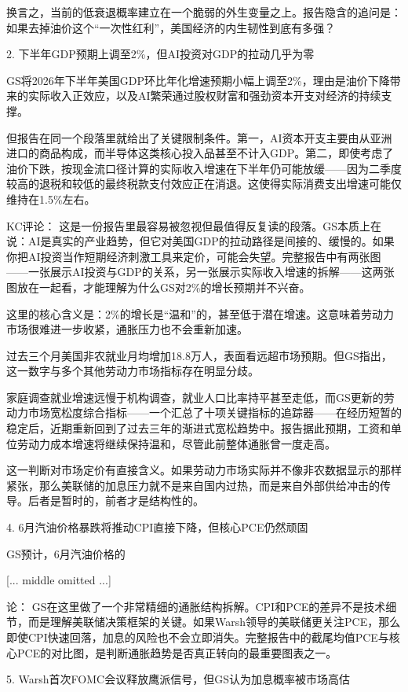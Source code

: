 \documentclass[11pt]{ctexart}
\begin{document}
换言之，当前的低衰退概率建立在一个脆弱的外生变量之上。报告隐含的追问是：如果去掉油价这个“一次性红利”，美国经济的内生韧性到底有多强？

2. 下半年GDP预期上调至2\%，但AI投资对GDP的拉动几乎为零

GS将2026年下半年美国GDP环比年化增速预期小幅上调至2\%，理由是油价下降带来的实际收入正效应，以及AI繁荣通过股权财富和强劲资本开支对经济的持续支撑。

但报告在同一个段落里就给出了关键限制条件。第一，AI资本开支主要由从亚洲进口的商品构成，而半导体这类核心投入品甚至不计入GDP。第二，即使考虑了油价下跌，按现金流口径计算的实际收入增速在下半年仍可能放缓——因为二季度较高的退税和较低的最终税款支付效应正在消退。这使得实际消费支出增速可能仅维持在1.5\%左右。

KC评论： 这是一份报告里最容易被忽视但最值得反复读的段落。GS本质上在说：AI是真实的产业趋势，但它对美国GDP的拉动路径是间接的、缓慢的。如果你把AI投资当作短期经济刺激工具来定价，可能会失望。完整报告中有两张图——一张展示AI投资与GDP的关系，另一张展示实际收入增速的拆解——这两张图放在一起看，才能理解为什么GS对2\%的增长预期并不兴奋。

这里的核心含义是：2\%的增长是“温和”的，甚至低于潜在增速。这意味着劳动力市场很难进一步收紧，通胀压力也不会重新加速。

过去三个月美国非农就业月均增加18.8万人，表面看远超市场预期。但GS指出，这一数字与多个其他劳动力市场指标存在明显分歧。

家庭调查就业增速远慢于机构调查，就业人口比率持平甚至走低，而GS更新的劳动力市场宽松度综合指标——一个汇总了十项关键指标的追踪器——在经历短暂的稳定后，近期重新回到了过去三年的渐进式宽松趋势中。报告据此预期，工资和单位劳动力成本增速将继续保持温和，尽管此前整体通胀曾一度走高。

这一判断对市场定价有直接含义。如果劳动力市场实际并不像非农数据显示的那样紧张，那么美联储的加息压力就不是来自国内过热，而是来自外部供给冲击的传导。后者是暂时的，前者才是结构性的。

4. 6月汽油价格暴跌将推动CPI直接下降，但核心PCE仍然顽固

GS预计，6月汽油价格的

[... middle omitted ...]

论： GS在这里做了一个非常精细的通胀结构拆解。CPI和PCE的差异不是技术细节，而是理解美联储决策框架的关键。如果Warsh领导的美联储更关注PCE，那么即使CPI快速回落，加息的风险也不会立即消失。完整报告中的截尾均值PCE与核心PCE的对比图，是判断通胀趋势是否真正转向的最重要图表之一。

5. Warsh首次FOMC会议释放鹰派信号，但GS认为加息概率被市场高估
\end{document}
